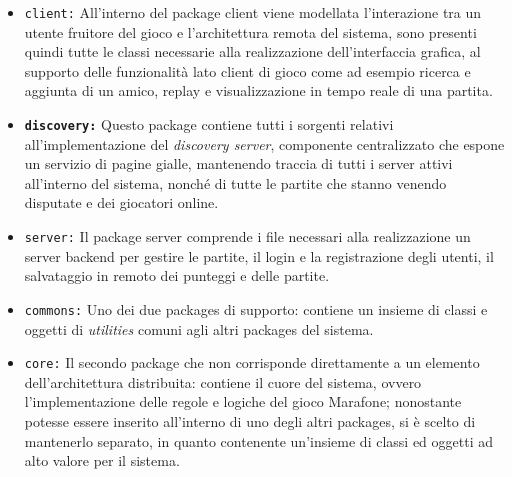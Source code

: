     \begin{itemize}
    \item{\texttt{client:}} All'interno del package client viene modellata l'interazione tra un utente fruitore del gioco e
    l'architettura remota del sistema, sono presenti quindi tutte le classi necessarie alla realizzazione dell'interfaccia grafica, al supporto delle funzionalità lato client di gioco come ad esempio ricerca e aggiunta di un amico, replay e visualizzazione in tempo reale di una partita.


    \item{\textbf{\texttt{discovery:}}}
      Questo package contiene tutti i sorgenti relativi all'implementazione del \textit{discovery server},
      componente centralizzato che espone un servizio di pagine gialle, mantenendo traccia di tutti i server attivi
      all'interno del sistema, nonché di tutte le partite che stanno venendo disputate e dei giocatori online.

    \item{\texttt{server:}}
      Il package server comprende i file necessari alla realizzazione un server backend per gestire le partite,
      il login e la registrazione degli utenti, il salvataggio in remoto dei punteggi e delle partite.

    \item{\texttt{commons:}}
      Uno dei due packages di supporto: contiene un insieme di classi e oggetti di \textit{utilities} comuni agli altri packages del sistema.

    \item{\texttt{core:}}
      Il secondo package che non corrisponde direttamente a un elemento dell'architettura distribuita: contiene il cuore del sistema, ovvero l'implementazione delle regole e logiche del gioco Marafone; nonostante potesse essere inserito all'interno di uno degli altri packages, si è scelto di mantenerlo separato, in quanto contenente un'insieme di classi ed oggetti ad alto valore per il sistema.

  \end{itemize}

